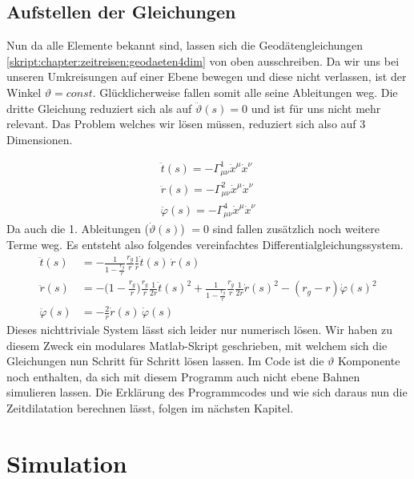 \begin{refsection}
	\subsection{Aufstellen der Gleichungen}
	
	Nun da alle Elemente bekannt sind, lassen sich die Geodätengleichungen \eqref{skript:chapter:zeitreisen:geodaeten4dim} von oben ausschreiben. Da wir uns bei unseren Umkreisungen auf einer Ebene bewegen und diese nicht verlassen, ist der Winkel $\vartheta = const$. Glücklicherweise fallen somit alle seine Ableitungen weg. Die dritte Gleichung reduziert sich als auf $\ddot{\vartheta}(s)=0$ und ist für uns nicht mehr relevant. Das Problem welches wir lösen müssen, reduziert sich also auf 3 Dimensionen. 
	
	\begin{align*}
	\ddot{t}(s) = -\Gamma^{1}_{\mu\nu}\dot{x}^{\mu}\dot{x}^{\nu}\\
	\ddot{r}(s) = -\Gamma^{2}_{\mu\nu}\dot{x}^{\mu}\dot{x}^{\nu}\\
	\ddot{\varphi}(s) = -\Gamma^{4}_{\mu\nu}\dot{x}^{\mu}\dot{x}^{\nu}		
	\end{align*}
	Da auch die 1. Ableitungen ($\dot{\vartheta}(s)$) $= 0$ sind fallen zusätzlich noch weitere Terme weg. Es entsteht also folgendes vereinfachtes Differentialgleichungssystem.
	\begin{equation}
	\begin{aligned}
	\ddot t(s)
	&=
	-\frac{1}{1-\displaystyle\frac{r_g}{r}}\frac{r_g}{r}\frac{1}{r}\dot t(s)\,\dot r(s)
	\\
	\ddot r(s)
	&=
	-\biggl(1-\frac{r_g}{r}\biggr)\frac{r_g}{r}\frac1{2r}\dot t(s)^2
	+\frac{1}{1-\displaystyle\frac{r_g}{r}} \frac{r_g}{r}\frac1{2r}\dot r(s)^2
	- (r_g-r) \dot\varphi(s)^2
	\\
	\ddot \varphi(s)
	&=
	-\frac2r \dot r(s)\,\dot\varphi(s)
	\end{aligned}
	\end{equation}\label{finaleq}
	Dieses nichttriviale System lässt sich leider nur numerisch lösen. Wir haben zu diesem Zweck ein modulares Matlab-Skript geschrieben, mit welchem sich die Gleichungen nun Schritt für Schritt lösen lassen. Im Code ist die $\vartheta$ Komponente noch enthalten, da sich mit diesem Programm auch nicht ebene Bahnen simulieren lassen. Die Erklärung des Programmcodes und wie sich daraus nun die Zeitdilatation berechnen lässt, folgen im nächsten Kapitel.
		
	\section{Simulation}
	

\end{refsection}

